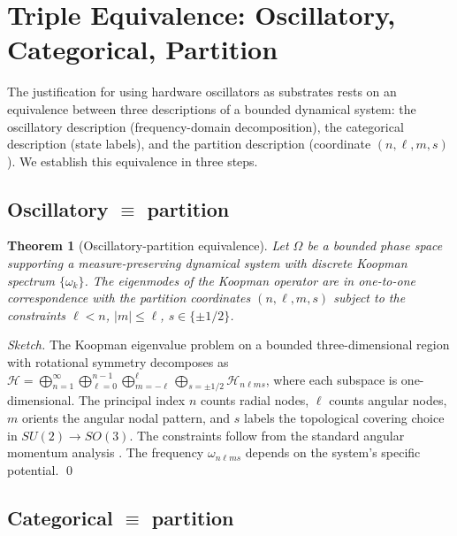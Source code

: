 \documentclass[twocolumn,11pt,a4paper]{article}
\newtheorem{theorem}{Theorem}[section]
\theoremstyle{definition}
\theoremstyle{remark}
\newcommand{\Hilb}{\mathcal{H}}
\begin{document}
\section{Triple Equivalence: Oscillatory, Categorical, Partition}
\label{sec:equivalence}

The justification for using hardware oscillators as substrates rests on an equivalence between three descriptions of a bounded dynamical system: the oscillatory description (frequency-domain decomposition), the categorical description (state labels), and the partition description (coordinate $(n, \ell, m, s)$). We establish this equivalence in three steps.

\subsection{Oscillatory $\equiv$ partition}

\begin{theorem}[Oscillatory-partition equivalence]
\label{thm:osc-part}
Let $\Omega$ be a bounded phase space supporting a measure-preserving dynamical system with discrete Koopman spectrum $\{\omega_k\}$. The eigenmodes of the Koopman operator are in one-to-one correspondence with the partition coordinates $(n, \ell, m, s)$ subject to the constraints $\ell < n$, $|m| \le \ell$, $s \in \{\pm 1/2\}$.
\end{theorem}

\begin{proof}[Sketch]
The Koopman eigenvalue problem on a bounded three-dimensional region with rotational symmetry decomposes as $\Hilb = \bigoplus_{n=1}^\infty \bigoplus_{\ell=0}^{n-1} \bigoplus_{m=-\ell}^{\ell} \bigoplus_{s=\pm 1/2} \Hilb_{n\ell ms}$, where each subspace is one-dimensional. The principal index $n$ counts radial nodes, $\ell$ counts angular nodes, $m$ orients the angular nodal pattern, and $s$ labels the topological covering choice in $SU(2) \to SO(3)$. The constraints follow from the standard angular momentum analysis \citep{griffiths2018,landau1977}. The frequency $\omega_{n\ell m s}$ depends on the system's specific potential. \qed
\end{proof}

\subsection{Categorical $\equiv$ partition}
\end{document}
